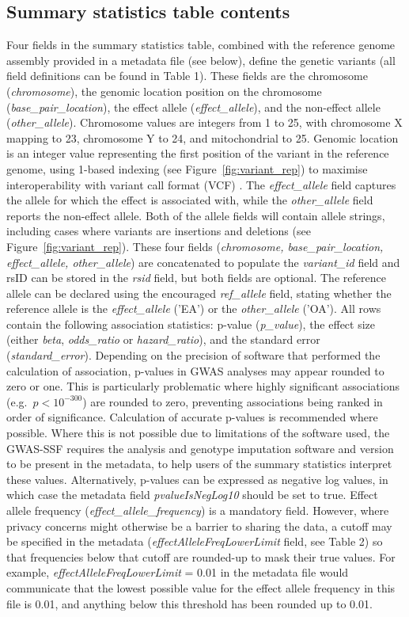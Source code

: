 \documentclass[11pt]{article}
\begin{document}
\subsection{Summary statistics table contents}
Four fields in the summary statistics table, combined with the reference genome assembly provided in a metadata file (see below), define the genetic variants (all field definitions can be found in Table 1). These fields are the chromosome (\textit{chromosome}), the genomic location position on the chromosome (\textit{base\_pair\_location}), the effect allele (\textit{effect\_allele}), and the non-effect allele (\textit{other\_allele}). Chromosome values are integers from 1 to 25, with chromosome X mapping to 23, chromosome Y to 24, and mitochondrial to 25. Genomic location is an integer value representing the first position of the variant in the reference genome, using 1-based indexing (see Figure~\ref{fig:variant_rep}) to maximise interoperability with variant call format (VCF) \cite{Danecek:2011ut}. The \textit{effect\_allele} field captures the allele for which the effect is associated with, while the \textit{other\_allele} field reports the non-effect allele. Both of the allele fields will contain allele strings, including cases where variants are insertions and deletions (see Figure~\ref{fig:variant_rep}). These four fields (\textit{chromosome, base\_pair\_location, effect\_allele, other\_allele}) are concatenated to populate the \textit{variant\_id} field and rsID can be stored in the \textit{rsid} field, but both fields are optional. The reference allele can be declared using the encouraged \textit{ref\_allele} field, stating whether the reference allele is the \textit{effect\_allele} ('EA') or the \textit{other\_allele} ('OA').
All rows contain the following association statistics: p-value (\textit{p\_value}), the effect size (either \textit{beta}, \textit{odds\_ratio} or \textit{hazard\_ratio}), and the standard error (\textit{standard\_error}). Depending on the precision of software that performed the calculation of association, p-values in GWAS analyses may appear rounded to zero or one. This is particularly problematic where highly significant associations (e.g.\ $p < 10^{-300}$) are rounded to zero, preventing associations being ranked in order of significance. Calculation of accurate p-values is recommended where possible. Where this is not possible due to limitations of the software used, the GWAS-SSF requires the analysis and genotype imputation software and version to be present in the metadata, to help users of the summary statistics interpret these values. Alternatively, p-values can be expressed as negative log values, in which case the metadata field \textit{pvalueIsNegLog10} should be set to true. Effect allele frequency (\textit{effect\_allele\_frequency}) is a mandatory field. However, where privacy concerns might otherwise be a barrier to sharing the data, a cutoff may be specified in the metadata (\textit{effectAlleleFreqLowerLimit} field, see Table 2) so that frequencies below that cutoff are rounded-up to mask their true values. For example, \textit{effectAlleleFreqLowerLimit} = 0.01 in the metadata file would communicate that the lowest possible value for the effect allele frequency in this file is 0.01, and anything below this threshold has been rounded up to 0.01.
\end{document}
